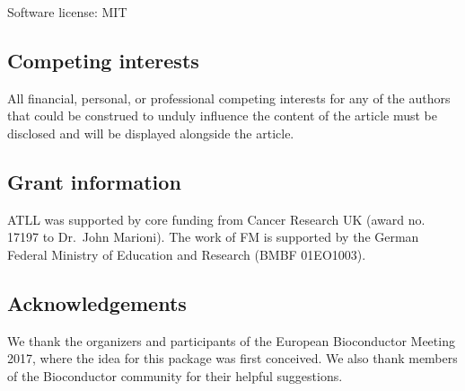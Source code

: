 \documentclass[10pt,a4paper,twocolumn]{article}
\begin{document}


Software license: MIT


\subsection*{Competing interests}
All financial, personal, or professional competing interests for any of the authors that
could be construed to unduly influence the content of the article must be disclosed and
will be displayed alongside the article.

\subsection*{Grant information}
ATLL was supported by core funding from Cancer Research UK (award no. 17197 to Dr.\ John Marioni).
The work of FM is supported by the German Federal Ministry of Education and Research (BMBF 01EO1003).

\subsection*{Acknowledgements}
We thank the organizers and participants of the European Bioconductor Meeting 2017, where the idea for this package was first conceived.
We also thank members of the Bioconductor community for their helpful suggestions.



{\small
}

\bigskip





\end{document}
